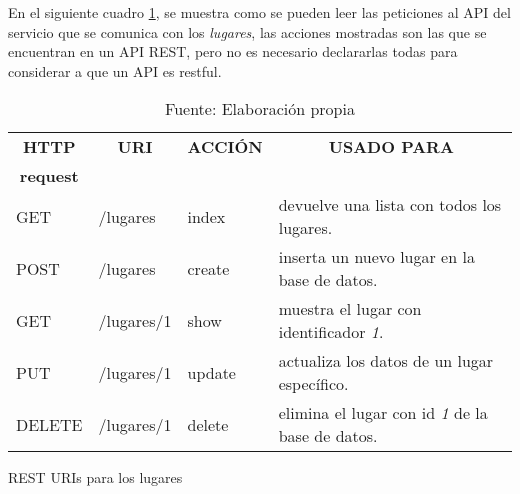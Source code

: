 



  En el siguiente cuadro \ref{tab:rest}, se muestra como se pueden leer las peticiones al API del servicio que se comunica con los \emph{lugares}, las acciones mostradas son las que se encuentran en un API REST, pero no es necesario declararlas todas para considerar a que un API es restful.\\


  \begin{table}[H]
    \begin{center}

      \begin{tabularx}{0.75\textwidth}{ l l l  X }
        \toprule
        \multicolumn{1}{c}{\textbf{HTTP}} &
        \multicolumn{1}{c}{\textbf{URI}}  &
        \multicolumn{1}{c}{\textbf{ACCI\'ON}} &
        \multicolumn{1}{c}{\textbf{USADO PARA}}  \\
        \multicolumn{1}{c}{\textbf{request}} & & & \\

        \midrule
        GET     &  /lugares    &  index    & devuelve una lista con todos los lugares.\\
        POST    &  /lugares    &  create   & inserta un nuevo lugar en la base de datos.\\
        GET     &  /lugares/1  &  show     & muestra el lugar con identificador \emph{1}.\\
        PUT     &  /lugares/1  &  update   & actualiza los datos de un lugar específico.\\
        DELETE  &  /lugares/1  &  delete   & elimina el lugar con id \emph{1} de la base de datos.\\
        \bottomrule
      \end{tabularx}

      \caption{REST URIs para los lugares}
      \label{tab:rest}

      \caption*{Fuente: Elaboración propia}
    \end{center}
  \end{table}

